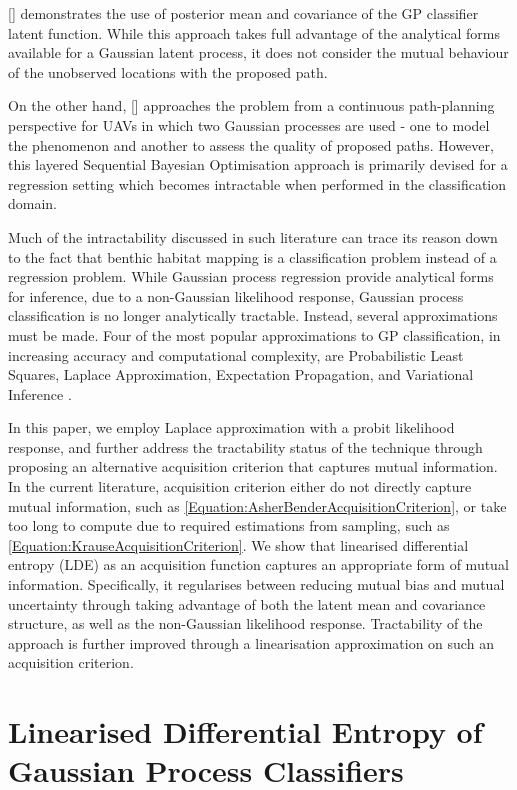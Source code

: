 \documentclass{article}
\newcommand{\incite}[1]{\citeauthor{#1} [\citeyear{#1}]}
\begin{document}
	\incite{Kapoor} demonstrates the use of posterior mean and covariance of the GP classifier latent function. While this approach takes full advantage of the analytical forms available for a Gaussian latent process, it does not consider the mutual behaviour of the unobserved locations with the proposed path.
	
	On the other hand, \incite{Roman:SequentialBayesianOptimisation} approaches the problem from a continuous path-planning perspective for UAVs in which two Gaussian processes are used - one to model the phenomenon and another to assess the quality of proposed paths. However, this layered Sequential Bayesian Optimisation approach is primarily devised for a regression setting which becomes intractable when performed in the classification domain.
	
	Much of the intractability discussed in such literature can trace its reason down to the fact that benthic habitat mapping is a classification problem instead of a regression problem. While Gaussian process regression provide analytical forms for inference, due to a non-Gaussian likelihood response, Gaussian process classification is no longer analytically tractable. Instead, several approximations must be made. Four of the most popular approximations to GP classification, in increasing accuracy and computational complexity, are Probabilistic Least Squares, Laplace Approximation, Expectation Propagation, and Variational Inference \cite{GaussianProcessForMachineLearning}.
	
	In this paper, we employ Laplace approximation with a probit likelihood response, and further address the tractability status of the technique through proposing an alternative acquisition criterion that captures mutual information. In the current literature, acquisition criterion either do not directly capture mutual information, such as \eqref{Equation:AsherBenderAcquisitionCriterion}, or take too long to compute due to required estimations from sampling, such as \eqref{Equation:KrauseAcquisitionCriterion}. We show that linearised differential entropy (LDE) as an acquisition function captures an appropriate form of mutual information. Specifically, it regularises between reducing mutual bias and mutual uncertainty through taking advantage of both the latent mean and covariance structure, as well as the non-Gaussian likelihood response. Tractability of the approach is further improved through a linearisation approximation on such an acquisition criterion.

\section{Linearised Differential Entropy of Gaussian Process Classifiers}
\label{Section:LinearisedEntropy}
\end{document}
